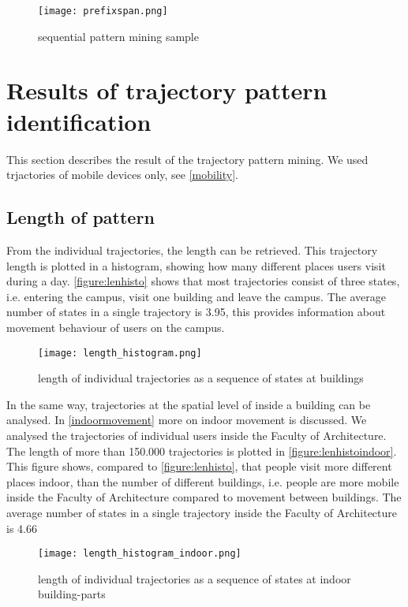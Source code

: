 \begin{figure}[H]
\centering
\texttt{[image: prefixspan.png]}
\captionsetup{justification=centering}
\caption{sequential pattern mining sample}
\label{figure:prefixspan}
\end{figure}


\section{Results of trajectory pattern identification}
This section describes the result of the trajectory pattern mining. We used trjactories of mobile devices only, see \autoref{mobility}. 
\subsection{Length of pattern}
From the individual trajectories, the length can be retrieved. This trajectory length is plotted in a histogram, showing how many different places users visit during a day. \autoref{figure:lenhisto} shows that most trajectories consist of three states, i.e. entering the campus, visit one building and leave the campus. The average number of states in a single trajectory is 3.95, this provides information about movement behaviour of users on the campus. 

\begin{figure}[H]
\centering
\texttt{[image: length\_histogram.png]}
\captionsetup{justification=centering}
\caption{length of individual trajectories as a sequence of states at buildings}
\label{figure:lenhisto}
\end{figure}
In the same way, trajectories at the spatial level of inside a building can be analysed. In \autoref{indoormovement} more on indoor movement is discussed. We analysed the trajectories of individual users inside the Faculty of Architecture. The length of more than 150.000 trajectories is plotted in \autoref{figure:lenhistoindoor}. This figure shows, compared to \autoref{figure:lenhisto}, that people visit more different places indoor, than the number of different buildings, i.e. people are more mobile inside the Faculty of Architecture compared to movement between buildings. The average number of states in a single trajectory inside the Faculty of Architecture is 4.66

\begin{figure}[H]
\centering
\texttt{[image: length\_histogram\_indoor.png]}
\captionsetup{justification=centering}
\caption{length of individual trajectories as a sequence of states at indoor building-parts}
\label{figure:lenhistoindoor}
\end{figure}


